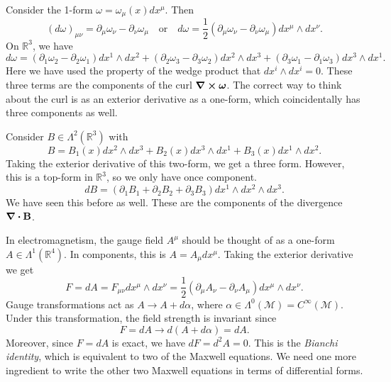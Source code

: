 \begin{example}
  Consider the 1-form $\omega = \omega_\mu(x) dx^\mu$. Then
  \begin{equation}
    (d\omega)_{\mu \nu} = \partial_\mu \omega_\nu - \partial_\nu \omega_\mu \quad \text{or} \quad
    d\omega = \frac{1}{2} (\partial_\mu \omega_\nu - \partial_\nu \omega_\mu) dx^\mu \wedge dx^\nu.
  \end{equation}
  On $\mathbb{R}^3$, we have
  \begin{equation}
    d\omega = (\partial_1 \omega_2 - \partial_2 \omega_1) dx^1 \wedge dx^2
    + (\partial_2 \omega_3 - \partial_3 \omega_2) dx^2 \wedge dx^3 +
    (\partial_3 \omega_1 - \partial_1 \omega_3) dx^3 \wedge dx^1.
  \end{equation}
  Here we have used the property of the wedge product that $dx^i \wedge dx^i = 0$.
  These three terms are the components of the curl $\curl \boldsymbol \omega$.
  The correct way to think about the curl is as an exterior derivative as a one-form, which coincidentally has three components as well.
\end{example}

\begin{example}
  Consider $B \in \Lambda^2(\mathbb{R}^3)$ with
  \begin{equation}
    B = B_1(x) dx^2 \wedge dx^3 +B_2(x) dx^3 \wedge dx^1 + B_3(x) dx^1 \wedge dx^2.
  \end{equation}
  Taking the exterior derivative of this two-form, we get a three form. However, this is a top-form in $\mathbb{R}^3$, so we only have once component.
  \begin{equation}
    dB = (\partial_1 B_1 + \partial_2 B_2 + \partial_3 B_3) dx^1 \wedge dx^2 \wedge dx^3.
  \end{equation}
  We have seen this before as well. These are the components of the divergence $\div \vb B$.
\end{example}

\begin{example}
  In electromagnetism, the gauge field $A^\mu$ should be thought of as a one-form $A \in \Lambda^1(\mathbb{R}^4)$.
  In components, this is $A = A_\mu dx^\mu$.
  Taking the exterior derivative we get 
  \begin{equation}
    F = dA = F_{\mu\nu} dx^\mu \wedge dx^\nu = \frac{1}{2} (\partial_\mu A_\nu - \partial_\nu A_\mu) dx^\mu \wedge dx^\nu.
  \end{equation}
  Gauge transformations act as $A \to A + d\alpha$, where $\alpha \in \Lambda^0(\mathcal{M}) = C^\infty(\mathcal{M})$.
  Under this transformation, the field strength is invariant since
  \begin{equation}
    F = dA \to d(A + d\alpha) = dA.
  \end{equation}
  Moreover, since $F = dA$ is exact, we have $dF = d^2A = 0$. This is the \emph{Bianchi identity}, which is equivalent to two of the Maxwell equations.
  We need one more ingredient to write the other two Maxwell equations in terms of differential forms.
\end{example}

